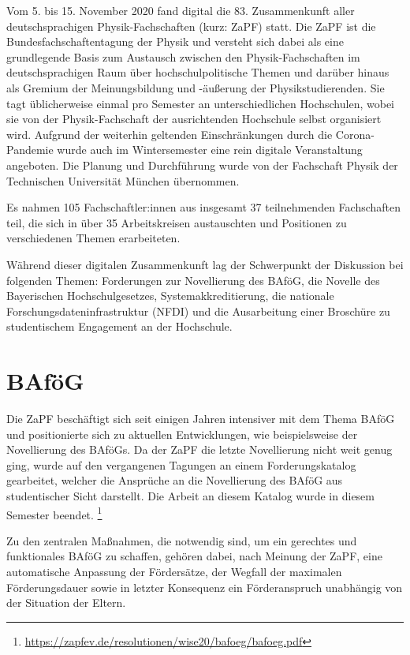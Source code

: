 Vom 5. bis 15. November 2020 fand digital die 83. Zusammenkunft aller deutschsprachigen Physik-Fachschaften (kurz: ZaPF) statt. Die ZaPF ist die Bundesfachschaftentagung der Physik und versteht sich dabei als eine grundlegende Basis zum Austausch zwischen den Physik-Fachschaften im deutschsprachigen Raum über hochschulpolitische Themen und darüber hinaus als Gremium der Meinungsbildung und -äußerung der Physikstudierenden. Sie tagt üblicherweise einmal pro Semester an unterschiedlichen Hochschulen, wobei sie von der Physik-Fachschaft der ausrichtenden Hochschule selbst organisiert wird. Aufgrund der weiterhin geltenden Einschränkungen durch die Corona-Pandemie wurde auch im Wintersemester eine rein digitale Veranstaltung angeboten. Die Planung und Durchführung wurde von der Fachschaft Physik der Technischen Universität München übernommen.

Es nahmen 105 Fachschaftler:innen aus insgesamt 37 teilnehmenden Fachschaften teil, die sich in über 35 Arbeitskreisen austauschten und Positionen zu verschiedenen Themen erarbeiteten.

Während dieser digitalen Zusammenkunft lag der Schwerpunkt der Diskussion bei folgenden Themen: Forderungen zur Novellierung des BAföG, die Novelle des Bayerischen Hochschulgesetzes, Systemakkreditierung, die nationale Forschungsdateninfrastruktur (NFDI) und die Ausarbeitung einer Broschüre zu studentischem Engagement an der Hochschule.

\section*{BAföG}

Die ZaPF beschäftigt sich seit einigen Jahren intensiver mit dem Thema BAföG und positionierte sich zu aktuellen Entwicklungen, wie beispielsweise der Novellierung des BAföGs. Da der ZaPF die letzte Novellierung nicht weit genug ging, wurde auf den vergangenen Tagungen an einem Forderungskatalog gearbeitet, welcher die Ansprüche an die Novellierung des BAföG aus studentischer Sicht darstellt. Die Arbeit an diesem Katalog wurde in diesem Semester beendet. \footnote{\url{https://zapfev.de/resolutionen/wise20/bafoeg/bafoeg.pdf}}

Zu den zentralen Maßnahmen, die notwendig sind, um ein gerechtes und funktionales BAföG zu schaffen, gehören dabei, nach Meinung der ZaPF, eine automatische Anpassung der Fördersätze, der Wegfall der maximalen Förderungsdauer sowie in letzter Konsequenz ein Förderanspruch unabhängig von der Situation der Eltern.

